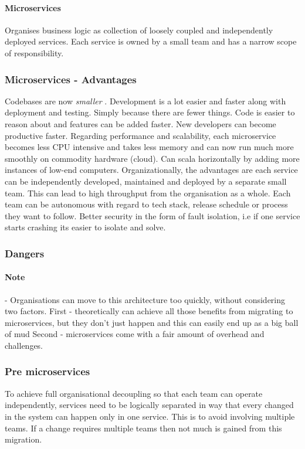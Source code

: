 \documentclass[a4paper, 11pt]{book}
\begin{document}
    \paragraph{Microservices}
    Organises business logic as collection of loosely coupled and independently deployed services.
    Each service is owned by a small team and has a narrow scope of responsibility.

    \subsubsection{Microservices - Advantages}
    Codebases are now \textit{smaller} .
    Development is a lot easier and faster along with deployment and testing.
    Simply because there are fewer things.
    Code is easier to reason about and features can be added faster.
    New developers can become productive faster.
    Regarding performance and scalability, each microservice becomes less CPU intensive and takes less memory and can now run much more smoothly on commodity hardware (cloud).
    Can scala horizontally by adding more instances of low-end computers.
    Organizationally, the advantages are each service can be independently developed, maintained and deployed by a separate small team.
    This can lead to high throughput from the organisation as a whole.
    Each team can be autonomous with regard to tech stack, release schedule or process they want to follow.
    Better security in the form of fault isolation, i.e if one service starts crashing its easier to isolate and solve.

    \subsubsection{Dangers}

    \paragraph{Note} - Organisations can move to this architecture too quickly, without considering two factors.
    First - theoretically can achieve all those benefits from migrating to microservices, but they don't just happen and this can easily end up as a big ball of mud
    Second - microservices come with a fair amount of overhead and challenges.

    \subsubsection{Pre microservices}
    To achieve full organisational decoupling so that each team can operate independently, services need to be logically separated in way that every changed in the system can happen only in one service.
    This is to avoid involving multiple teams.
    If a change requires multiple teams then not much is gained from this migration.
\end{document}
